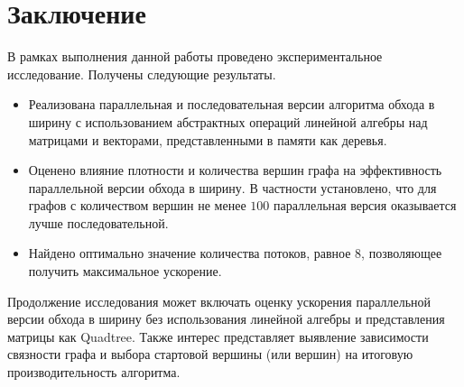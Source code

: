 
\section*{Заключение}
В рамках выполнения данной работы проведено экспериментальное исследование. Получены следующие результаты.
\begin{itemize}
    \item Реализована параллельная и последовательная версии алгоритма обхода в ширину с использованием абстрактных операций линейной алгебры над матрицами и векторами, представленными в памяти как деревья.
    \item Оценено влияние плотности и количества вершин графа на эффективность параллельной версии обхода в ширину. В частности установлено, что для графов с количеством вершин не менее $100$ параллельная версия оказывается лучше последовательной.
    \item Найдено оптимально значение количества потоков, равное $8$, позволяющее получить максимальное ускорение.
\end{itemize}

Продолжение исследования может включать оценку ускорения параллельной версии обхода в ширину без использования линейной алгебры и представления матрицы как Quadtree.
Также интерес представляет выявление зависимости связности графа и выбора стартовой вершины (или вершин) на итоговую производительность алгоритма.
